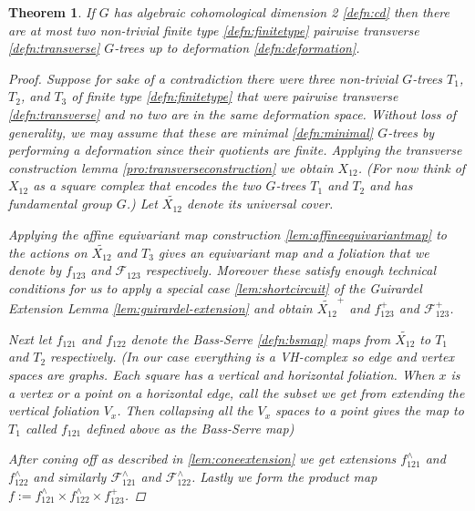 \documentclass{article}
\theoremstyle{mystyle}
\newtheorem{thm}{Theorem}[section]
\theoremstyle{remark}
\begin{document}
\begin{thm}
    \label{thm:mainresult}
    If \(G\) has algebraic cohomological dimension 2 \ref{defn:cd}  then there are at most two non-trivial finite type \ref{defn:finitetype} pairwise transverse \ref{defn:transverse} \(G\)-trees up to deformation \ref{defn:deformation}.
    \begin{proof}
        Suppose for sake of a contradiction there were three non-trivial \(G\)-trees \(T_{1}\), \(T_{2}\), and \(T_{3}\) of finite type \ref{defn:finitetype} that were pairwise transverse \ref{defn:transverse} and no two are in the same deformation space. Without loss of generality, we may assume that these are minimal \ref{defn:minimal} \(G\)-trees by performing a deformation since their quotients are finite.  Applying the transverse construction lemma \ref{pro:transverseconstruction} we obtain \(X_{12}\). (For now think of $X_{12}$ as a square complex that encodes the two $G$-trees $T_1$ and $T_2$ and has fundamental group $G$.)  Let \(\widetilde {X_{12}}\) denote its universal cover. 
        
        Applying the affine equivariant map construction \ref{lem:affineequivariantmap} to the actions on \(\widetilde {X_{12}}\) and \(T_{3}\) gives an equivariant  map and a foliation that we denote by \(f_{123}\) and \(\mathscr{F}_{123}\) respectively. Moreover these satisfy enough technical conditions for us to apply a special case \ref{lem:shortcircuit} of the Guirardel Extension Lemma \ref{lem:guirardel-extension} and obtain \(\widetilde{X_{12}}^{+}\) and \(f_{123}^{+}\) and \(\mathscr{F}_{123}^{+}\).

        Next let  \(f_{121}\) and  \(f_{122}\)  denote the Bass-Serre \ref{defn:bsmap} maps from \(\widetilde {X_{12}}\) to \(T_{1}\) and \(T_{2}\) respectively. (In our case everything is a VH-complex so edge and vertex spaces are graphs. Each square has a vertical and horizontal foliation. When $x$ is a vertex or a point on a horizontal edge, call the subset we get from extending the vertical foliation $V_x$. Then collapsing all the $V_x$ spaces to a point gives the map to $T_1$ called \(f_{121}\) defined above as the Bass-Serre map)
        
        After coning off as described in \ref{lem:coneextension} we get extensions \(f_{121}^{\wedge}\) and \(f_{122}^{\wedge}\) and similarly \(\mathscr{F}^{\wedge}_{121}\) and \(\mathscr{F}^{\wedge}_{122}\). Lastly we form the product map \(f:= f_{121}^{\wedge} \times f_{122}^{\wedge} \times f_{123}^{+}\). 


\end{proof}
\end{thm}
\end{document}
